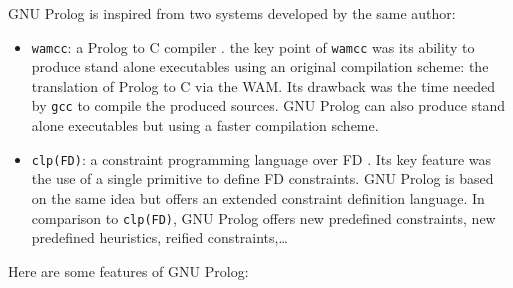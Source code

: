 GNU Prolog is inspired from two systems developed by the same author:

\begin{itemize}

\item \texttt{wamcc}: a Prolog to C compiler \cite{wamcc}. the key point of \texttt{wamcc} was its
ability to produce stand alone executables using an original compilation
scheme: the translation of Prolog to C via the WAM. Its drawback was the time
needed by \texttt{gcc} to compile the produced sources. GNU Prolog can also
produce stand alone executables but using a faster compilation scheme.

\item \texttt{clp(FD)}: a constraint programming language over FD
\cite{long-clp-fd}. Its key feature was the use of a
single primitive to define FD constraints. GNU Prolog is based on the same
idea but offers an extended constraint definition language. In comparison to
\texttt{clp(FD)}, GNU Prolog offers new predefined constraints, new
predefined heuristics, reified constraints,\ldots

\end{itemize}

Here are some features of GNU Prolog:

